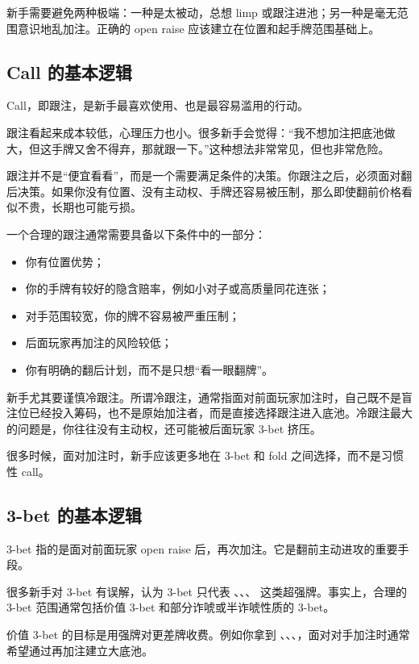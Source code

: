 新手需要避免两种极端：一种是太被动，总想 limp 或跟注进池；另一种是毫无范围意识地乱加注。正确的 open raise 应该建立在位置和起手牌范围基础上。

\subsection{Call 的基本逻辑}

Call，即跟注，是新手最喜欢使用、也是最容易滥用的行动。

跟注看起来成本较低，心理压力也小。很多新手会觉得：“我不想加注把底池做大，但这手牌又舍不得弃，那就跟一下。”这种想法非常常见，但也非常危险。

跟注并不是“便宜看看”，而是一个需要满足条件的决策。你跟注之后，必须面对翻后决策。如果你没有位置、没有主动权、手牌还容易被压制，那么即使翻前价格看似不贵，长期也可能亏损。

一个合理的跟注通常需要具备以下条件中的一部分：

\begin{itemize}
\item 你有位置优势；
\item 你的手牌有较好的隐含赔率，例如小对子或高质量同花连张；
\item 对手范围较宽，你的牌不容易被严重压制；
\item 后面玩家再加注的风险较低；
\item 你有明确的翻后计划，而不是只想“看一眼翻牌”。
\end{itemize}

新手尤其要谨慎冷跟注。所谓冷跟注，通常指面对前面玩家加注时，自己既不是盲注位已经投入筹码，也不是原始加注者，而是直接选择跟注进入底池。冷跟注最大的问题是，你往往没有主动权，还可能被后面玩家 3-bet 挤压。

很多时候，面对加注时，新手应该更多地在 3-bet 和 fold 之间选择，而不是习惯性 call。

\subsection{3-bet 的基本逻辑}

3-bet 指的是面对前面玩家 open raise 后，再次加注。它是翻前主动进攻的重要手段。

很多新手对 3-bet 有误解，认为 3-bet 只代表 、、、 这类超强牌。事实上，合理的 3-bet 范围通常包括价值 3-bet 和部分诈唬或半诈唬性质的 3-bet。

价值 3-bet 的目标是用强牌对更差牌收费。例如你拿到 、、、，面对对手加注时通常希望通过再加注建立大底池。

